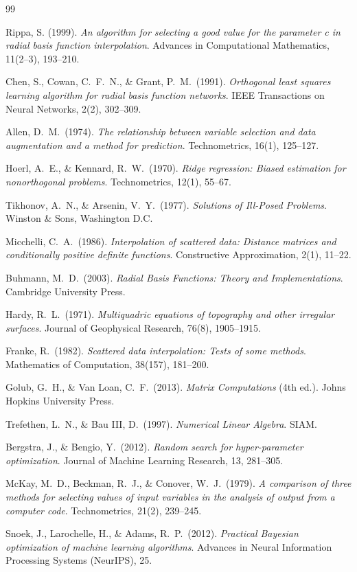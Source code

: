 \documentclass[11pt,a4paper]{article}
\begin{document}
\begin{thebibliography}{99}

Rippa, S. (1999).
\emph{An algorithm for selecting a good value for the parameter c in radial
basis function interpolation}.
Advances in Computational Mathematics, 11(2--3), 193--210.

Chen, S., Cowan, C.\ F.\ N., \& Grant, P.\ M.\ (1991).
\emph{Orthogonal least squares learning algorithm for radial basis function
networks}.
IEEE Transactions on Neural Networks, 2(2), 302--309.

Allen, D.\ M.\ (1974).
\emph{The relationship between variable selection and data augmentation and
a method for prediction}.
Technometrics, 16(1), 125--127.

Hoerl, A.\ E., \& Kennard, R.\ W.\ (1970).
\emph{Ridge regression: Biased estimation for nonorthogonal problems}.
Technometrics, 12(1), 55--67.

Tikhonov, A.\ N., \& Arsenin, V.\ Y.\ (1977).
\emph{Solutions of Ill-Posed Problems}.
Winston \& Sons, Washington D.C.

Micchelli, C.\ A.\ (1986).
\emph{Interpolation of scattered data: Distance matrices and conditionally
positive definite functions}.
Constructive Approximation, 2(1), 11--22.

Buhmann, M.\ D.\ (2003).
\emph{Radial Basis Functions: Theory and Implementations}.
Cambridge University Press.

Hardy, R.\ L.\ (1971).
\emph{Multiquadric equations of topography and other irregular surfaces}.
Journal of Geophysical Research, 76(8), 1905--1915.

Franke, R.\ (1982).
\emph{Scattered data interpolation: Tests of some methods}.
Mathematics of Computation, 38(157), 181--200.

Golub, G.\ H., \& Van Loan, C.\ F.\ (2013).
\emph{Matrix Computations} (4th ed.).
Johns Hopkins University Press.

Trefethen, L.\ N., \& Bau III, D.\ (1997).
\emph{Numerical Linear Algebra}.
SIAM.

Bergstra, J., \& Bengio, Y.\ (2012).
\emph{Random search for hyper-parameter optimization}.
Journal of Machine Learning Research, 13, 281--305.

McKay, M.\ D., Beckman, R.\ J., \& Conover, W.\ J.\ (1979).
\emph{A comparison of three methods for selecting values of input variables
in the analysis of output from a computer code}.
Technometrics, 21(2), 239--245.

Snoek, J., Larochelle, H., \& Adams, R.\ P.\ (2012).
\emph{Practical Bayesian optimization of machine learning algorithms}.
Advances in Neural Information Processing Systems (NeurIPS), 25.

\end{thebibliography}
\end{document}
